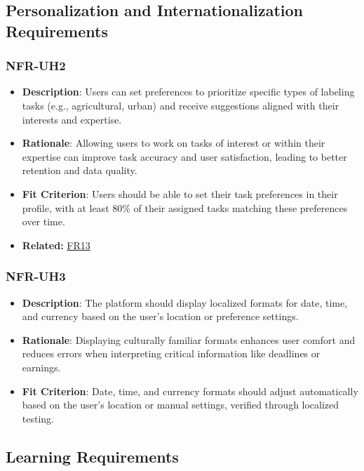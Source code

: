 \documentclass[12pt]{article}
\begin{document}
\subsection{Personalization and Internationalization Requirements}


\subsubsection*{NFR-UH2} 
\label{sec:UH2}
        \begin{itemize}
            \item \textbf{Description}: Users can set preferences to prioritize specific types of labeling tasks (e.g., agricultural, urban) and receive suggestions aligned with their interests and expertise.  
            \item \textbf{Rationale}: Allowing users to work on tasks of interest or within their expertise can improve task accuracy and user satisfaction, leading to better retention and data quality.  
            \item \textbf{Fit Criterion}: Users should be able to set their task preferences in their profile, with at least 80\% of their assigned tasks matching these preferences over time.
            \item \textbf{Related:} \hyperref[sec:FR13]{FR13}
        \end{itemize}
        \subsubsection*{NFR-UH3} 
        \label{sec:UH3}
        \begin{itemize}
            \item \textbf{Description}: The platform should display localized formats for date, time, and currency based on the user's location or preference settings.  
            \item \textbf{Rationale}: Displaying culturally familiar formats enhances user comfort and reduces errors when interpreting critical information like deadlines or earnings.  
            \item \textbf{Fit Criterion}: Date, time, and currency formats should adjust automatically based on the user’s location or manual settings, verified through localized testing.
        \end{itemize}


\subsection{Learning Requirements}
\end{document}
